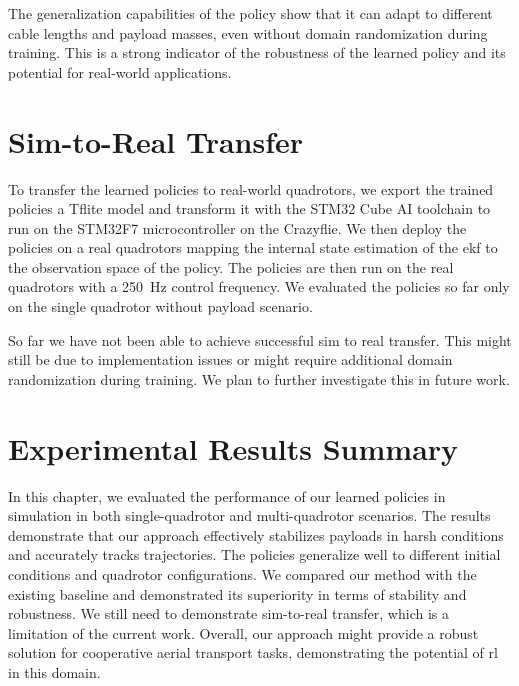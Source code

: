 The generalization capabilities of the policy show that it can adapt to different cable lengths and payload masses, even without domain randomization during training. This is a strong indicator of the robustness of the learned policy and its potential for real-world applications.

\section{Sim-to-Real Transfer}
To transfer the learned policies to real-world quadrotors, we export the trained policies a Tflite model and transform it with the STM32 Cube AI toolchain to run on the STM32F7 microcontroller on the Crazyflie. We then deploy the policies on a real quadrotors mapping the internal state estimation of the \gls{ekf} to the observation space of the policy. The policies are then run on the real quadrotors with a 250~Hz control frequency. We evaluated the policies so far only on the single quadrotor without payload scenario. 

So far we have not been able to achieve successful sim to real transfer. This might still be due to implementation issues or might require additional domain randomization during training. We plan to further investigate this in future work.
\section{Experimental Results Summary}
In this chapter, we evaluated the performance of our learned policies in simulation in both single-quadrotor and multi-quadrotor scenarios. The results demonstrate that our approach effectively stabilizes payloads in harsh conditions and accurately tracks trajectories. The policies generalize well to different initial conditions and quadrotor configurations. We compared our method with the existing baseline and demonstrated its superiority in terms of stability and robustness. We still need to demonstrate sim-to-real transfer, which is a limitation of the current work. Overall, our approach might provide a robust solution for cooperative aerial transport tasks, demonstrating the potential of \gls{rl} in this domain.